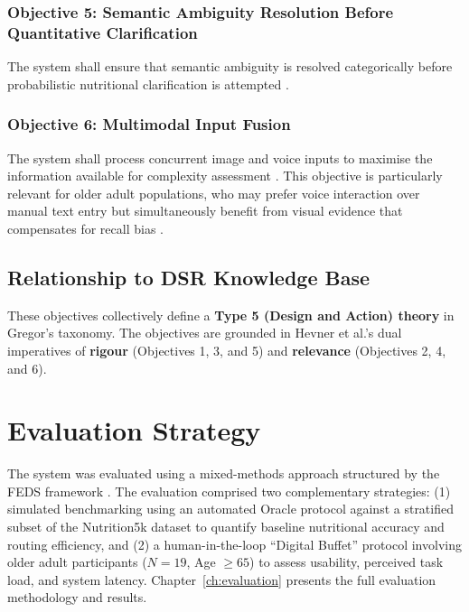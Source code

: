 \subsubsection{Objective 5: Semantic Ambiguity Resolution Before Quantitative Clarification}
The system shall ensure that semantic ambiguity is resolved categorically before probabilistic nutritional clarification is attempted \citep{kuhnCLAMSelectiveClarification2023,yaoReActSynergizingReasoning2022}.

\subsubsection{Objective 6: Multimodal Input Fusion}
The system shall process concurrent image and voice inputs to maximise the information available for complexity assessment \citep{loImageBasedFoodClassification2020,zhangImagebasedMethodsDietary2024}. This objective is particularly relevant for older adult populations, who may prefer voice interaction over manual text entry but simultaneously benefit from visual evidence that compensates for recall bias \citep{wildenbosAgingBarriersInfluencing2018,moshfeghUSDepartmentAgriculture2008}.

\subsection{Relationship to DSR Knowledge Base}

These objectives collectively define a \textbf{Type 5 (Design and Action) theory} in Gregor's \citep{gregorNatureTheoryInformation2006} taxonomy. The objectives are grounded in Hevner et al.'s \citep{hevnerDesignScienceInformation2004} dual imperatives of \textbf{rigour} (Objectives 1, 3, and 5) and \textbf{relevance} (Objectives 2, 4, and 6).

\section{Evaluation Strategy}

The system was evaluated using a mixed-methods approach structured by the FEDS framework \citep{venableFEDSFrameworkEvaluation2016}. The evaluation comprised two complementary strategies: (1) simulated benchmarking using an automated Oracle protocol against a stratified subset of the Nutrition5k dataset \citep{thamesNutrition5kAutomaticNutritional2021} to quantify baseline nutritional accuracy and routing efficiency, and (2) a human-in-the-loop ``Digital Buffet'' protocol involving older adult participants ($N=19$, Age $\geq 65$) to assess usability, perceived task load, and system latency. Chapter~\ref{ch:evaluation} presents the full evaluation methodology and results.

